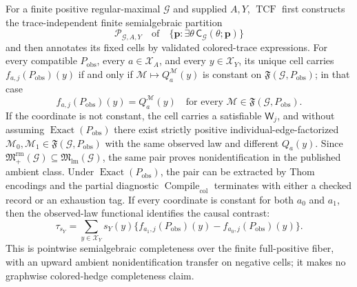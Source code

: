 For a finite positive regular-maximal \(\mathcal G\) and supplied \(A,Y\), \(\operatorname{TCF}\) first constructs the trace-independent finite semialgebraic partition
\[
\mathscr P_{\mathcal G,A,Y}
\quad\text{of}\quad
\{\mathbf p:\exists\theta\,\mathsf C_{\mathcal G}(\theta;\mathbf p)\}
\]
and then annotates its fixed cells by validated colored-trace expressions. For every compatible \(P_{\mathrm{obs}}\), every \(a\in\mathcal X_A\), and every \(y\in\mathcal X_Y\), its unique cell carries \(f_{a,j}(P_{\mathrm{obs}})(y)\) if and only if \(\mathcal M\mapsto Q_a^{\mathcal M}(y)\) is constant on \(\mathfrak F(\mathcal G,P_{\mathrm{obs}})\); in that case
\[
f_{a,j}(P_{\mathrm{obs}})(y)=Q_a^{\mathcal M}(y)
\quad\text{for every }\mathcal M\in\mathfrak F(\mathcal G,P_{\mathrm{obs}}).
\]
If the coordinate is not constant, the cell carries a satisfiable \(\mathsf W_j\), and without assuming \(\operatorname{Exact}(P_{\mathrm{obs}})\) there exist strictly positive individual-edge-factorized \(\mathcal M_0,\mathcal M_1\in\mathfrak F(\mathcal G,P_{\mathrm{obs}})\) with the same observed law and different \(Q_a(y)\). Since \(\mathfrak M_{+}^{\mathrm{rm}}(\mathcal G)\subseteq\mathfrak M_{\mathrm{lm}}(\mathcal G)\), the same pair proves nonidentification in the published ambient class. Under \(\operatorname{Exact}(P_{\mathrm{obs}})\), the pair can be extracted by Thom encodings and the partial diagnostic \(\operatorname{Compile}_{\mathrm{col}}\) terminates with either a checked record or an exhaustion tag. If every coordinate is constant for both \(a_0\) and \(a_1\), then the observed-law functional identifies the causal contrast:
\[
\tau_{s_Y}
=\sum_{y\in\mathcal X_Y}s_Y(y)
\{f_{a_1,j}(P_{\mathrm{obs}})(y)-f_{a_0,j}(P_{\mathrm{obs}})(y)\}.
\]
This is pointwise semialgebraic completeness over the finite full-positive fiber, with an upward ambient nonidentification transfer on negative cells; it makes no graphwise colored-hedge completeness claim.